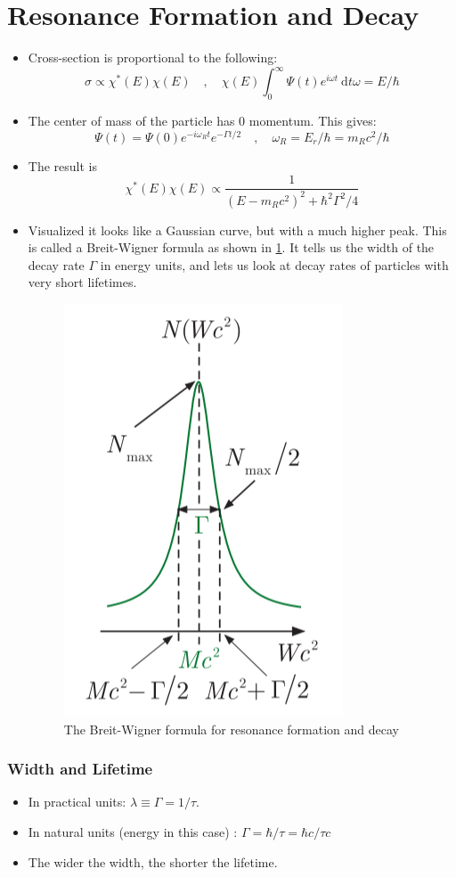 \section{Resonance Formation and Decay}
\begin{itemize}
  \item Cross-section is proportional to the following:
  \begin{equation}
    σ \propto χ^{*}(E) χ(E) \quad , \quad  χ(E) ∫_{0}^{∞} Ψ(t)e^{iωt} \ \mathrm{d}t  ω = E / ℏ
  \end{equation}
  \item The center of mass of the particle has 0 momentum. This gives:
  \begin{equation}
    Ψ(t) = Ψ(0) e^{-iω_{R}t} e^{- Γt / 2} \quad , \quad  ω_{R} = E_{r} / ℏ = m_{R}c^2 / ℏ
  \end{equation}
  \item The result is 
  \begin{equation}
    χ^{*}(E) χ(E) ∝ \frac{1}{(E - m_{R}c^2)^2 + ℏ^2 Γ^2 / 4}
  \end{equation}
  \item Visualized it looks like a Gaussian curve, but with a much higher peak. This is called a Breit-Wigner formula as shown in \cref{fig: breit-wigner_formula}. It tells us the width of the decay rate $Γ$ in energy units, and lets us look at decay rates of particles with very short lifetimes.
  \begin{figure}[h!]
  \centering
  \includegraphics[width = .35\textwidth]{breit-wigner_formula.png}
  \caption{The Breit-Wigner formula for resonance formation and decay}
  \label{fig: breit-wigner_formula}
  \end{figure}
\end{itemize}
\subsubsection{Width and Lifetime}
\begin{itemize}
  \item In practical units: $λ ≡ Γ = 1 / τ$. 
  \item In natural units (energy in this case) : $Γ = ℏ / τ = ℏc / τc$
  \item The wider the width, the shorter the lifetime. 
\end{itemize}

